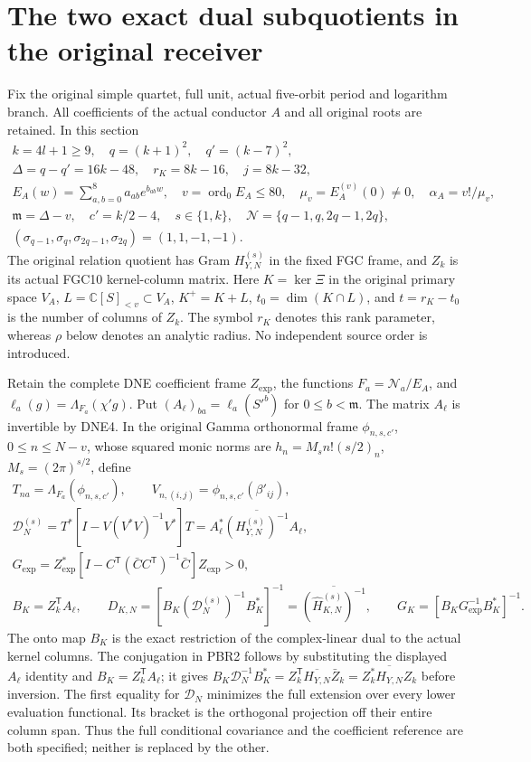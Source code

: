 \documentclass[11pt,a4paper]{article}
\providecommand{\C}{\mathbb C}
\begin{document}
\section{The two exact dual subquotients in the original receiver}
\label{sec:PBR}

Fix the original simple quartet, full unit, actual five-orbit period
and logarithm branch. All coefficients of the actual conductor $A$
and all original roots are retained. In this section
\[
\begin{gathered}
 k=4l+1\ge9,\quad q=(k+1)^2,\quad q'=(k-7)^2,\\
 \Delta=q-q'=16k-48,\quad r_K=8k-16,\quad j=8k-32,\\
 E_A(w)=\sum_{a,b=0}^8a_{ab}e^{b_{ab}w},\quad
 v=\operatorname{ord}_0E_A\le80,\quad
 \mu_v=E_A^{(v)}(0)\ne0,\quad \alpha_A=v!/\mu_v,\\
 \mathfrak m=\Delta-v,\quad c'=k/2-4,\quad
 s\in\{1,k\},\quad
 \mathcal N=\{q-1,q,2q-1,2q\},\\
 (\sigma_{q-1},\sigma_q,\sigma_{2q-1},\sigma_{2q})=(1,1,-1,-1).
\end{gathered}\tag{PBR1}
\]
The original relation quotient has Gram $H_{Y,N}^{(s)}$ in the
fixed FGC frame, and $Z_k$ is its actual FGC10 kernel-column matrix.
Here $K=\ker\Xi$ in the original primary space $V_A$,
$L=\C[S]_{<v}\subset V_A$, $K^+=K+L$, $t_0=\dim(K\cap L)$,
and $t=r_K-t_0$ is the number of columns of $Z_k$.
The symbol $r_K$ denotes this rank parameter, whereas $\rho$ below
denotes an analytic radius. No independent source order is introduced.

Retain the complete DNE coefficient frame $Z_{\exp}$, the functions
$F_a=\mathcal N_a/E_A$, and
$\ell_a(g)=\Lambda_{F_a}(\chi'g)$.
Put $(A_\ell)_{ba}=\ell_a(S'^b)$ for $0\le b<\mathfrak m$.
The matrix $A_\ell$ is invertible by DNE4. In the original Gamma
orthonormal frame $\phi_{n,s,c'}$, $0\le n\le N-v$, whose squared
monic norms are $h_n=M_sn!(s/2)_n$, $M_s=(2\pi)^{s/2}$, define
\[
\begin{gathered}
 T_{na}=\Lambda_{F_a}(\phi_{n,s,c'}),\qquad
 V_{n,(i,j)}=\phi_{n,s,c'}(\beta'_{ij}),\\
 \mathcal D_N^{(s)}
 =T^*[I-V(V^*V)^{-1}V^*]T
 =A_\ell^*\overline{(H_{Y,N}^{(s)})^{-1}}A_\ell,\\
 G_{\exp}=Z_{\exp}^*
 [I-C^{\mathsf T}(\bar C C^{\mathsf T})^{-1}\bar C]Z_{\exp}>0,\\
 B_K=Z_k^{\mathsf T}A_\ell,\qquad
 D_{K,N}=[B_K(\mathcal D_N^{(s)})^{-1}B_K^*]^{-1}
       =\overline{(\widehat H_{K,N}^{(s)})^{-1}},\qquad
 G_K=[B_KG_{\exp}^{-1}B_K^*]^{-1}.
\end{gathered}\tag{PBR2}
\]
The onto map $B_K$ is the exact restriction of the complex-linear
dual to the actual kernel columns. The conjugation in PBR2 follows
by substituting the displayed $A_\ell$ identity and
$B_K=Z_k^{\mathsf T}A_\ell$; it gives
$B_K\mathcal D_N^{-1}B_K^*
=Z_k^{\mathsf T}\overline{H_{Y,N}}\bar Z_k
=\overline{Z_k^*H_{Y,N}Z_k}$ before inversion.
The first equality for $\mathcal D_N$ minimizes the full extension
over every lower evaluation functional. Its bracket is the
orthogonal projection off their entire column span. Thus the full
conditional covariance and the coefficient reference are both
specified; neither is replaced by the other.
\end{document}
